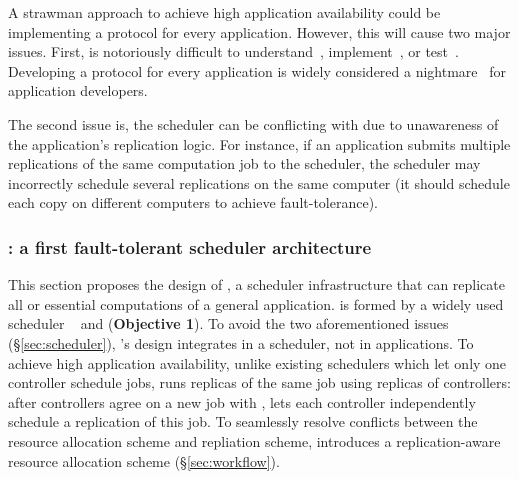 A strawman approach to achieve high application availability could be 
implementing a \paxos protocol for every application. However, this will cause 
two major issues. First, \paxos is notoriously difficult to 
understand~\cite{raft:usenix14,paxos:simple}, implement~\cite{paxos:practical, 
paxos:live}, or test~\cite{modist:nsdi09,demeter:sosp11}. Developing a 
\paxos protocol for every application is widely considered a 
nightmare~\cite{modist:nsdi09,demeter:sosp11,paxos:live} for application 
developers.

The second issue is, the scheduler can be conflicting with \paxos due to 
unawareness of the application's \paxos replication logic. For instance, if an 
application submits multiple replications of the same computation job to the 
scheduler, the scheduler may incorrectly schedule several replications on the 
same computer (it should schedule each copy on different computers to achieve 
\paxos fault-tolerance).

\vspace{-.15in}\subsubsection{\tripod: a first fault-tolerant scheduler 
architecture} 
\label{sec:scheduler-arch}\vspace{-.075in}

This section proposes the design of \tripod, a scheduler infrastructure that 
can replicate all or essential computations of a general application. 
\tripod is formed by a widely used scheduler \mesos~\cite{mesos:nsdi11} and 
\falcon (\textbf{Objective 1}). To avoid the two aforementioned issues 
(\S\ref{sec:scheduler}), \tripod's design integrates \paxos in a scheduler, 
not in applications. To achieve high application availability, unlike existing 
schedulers which let only one controller schedule jobs, \tripod runs replicas 
of the same job using replicas of controllers: after controllers agree on a new 
job with \falcon, \tripod lets each controller independently schedule a 
replication of this job. To seamlessly resolve conflicts between the resource 
allocation scheme and repliation scheme, \tripod introduces a replication-aware 
resource allocation scheme (\S\ref{sec:workflow}).



